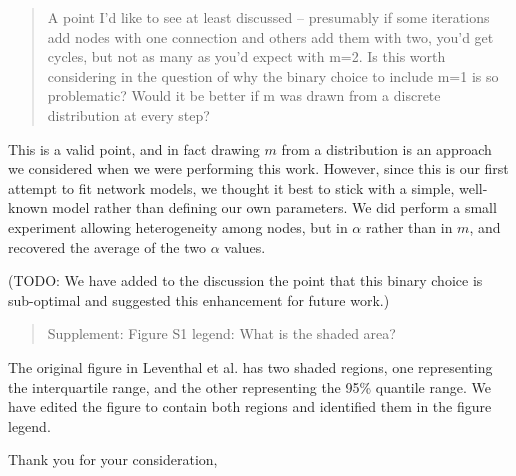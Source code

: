 \documentclass[12pt]{letter}
\begin{document}
\begin{letter}{ }
\begin{quote}
  \itshape

  A point I’d like to see at least discussed – presumably if some iterations
  add nodes with one connection and others add them with two, you’d get cycles,
  but not as many as you’d expect with m=2. Is this worth considering in the
  question of why the binary choice to include m=1 is so problematic? Would it
  be better if m was drawn from a discrete distribution at every step?
\end{quote}

This is a valid point, and in fact drawing $m$ from a distribution is an
approach we considered when we were performing this work. However, since this
is our first attempt to fit network models, we thought it best to stick with
a simple, well-known model rather than defining our own parameters. We did
perform a small experiment allowing heterogeneity among nodes, but in $\alpha$
rather than in $m$, and recovered the average of the two $\alpha$ values.

(TODO: We
have added to the discussion the point that this binary choice is sub-optimal
and suggested this enhancement for future work.)

\begin{quote}
  Supplement:
  Figure S1 legend: What is the shaded area?
\end{quote}

The original figure in Leventhal et al. has two shaded regions, one
representing the interquartile range, and the other representing the 95\%
quantile range. We have edited the figure to contain both regions and
identified them in the figure legend.

\closing{Thank you for your consideration,}
\end{letter}
\end{document}
